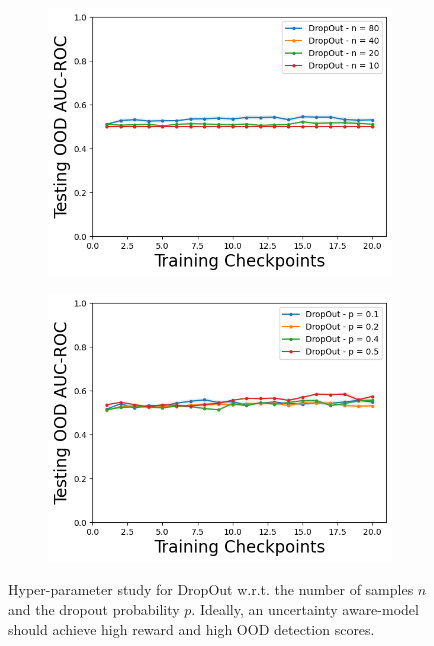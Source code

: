 \begin{figure}
    \begin{subfigure}{.45\textwidth}
        \includegraphics[width=\textwidth]{sections/011_icml2022/resources/CartPoleOOD-v0-AUC-ROC-epistemic_-testing-hyperparameter-n_sample-dropout.png}
    \end{subfigure}
        \begin{subfigure}{.45\textwidth}
        \includegraphics[width=\textwidth]{sections/011_icml2022/resources/CartPoleOOD-v0-AUC-ROC-epistemic_-testing-hyperparameter-p-dropout.png}
    \end{subfigure}
        \vspace{-3mm}
    \caption{Hyper-parameter study for DropOut w.r.t. the number of samples $n$ and the dropout probability $p$. Ideally, an uncertainty aware-model should achieve high reward and high OOD detection scores.}
    \label{fig:hyperparameter-dropout-cartpole}
    \vspace{-4mm}
\end{figure}